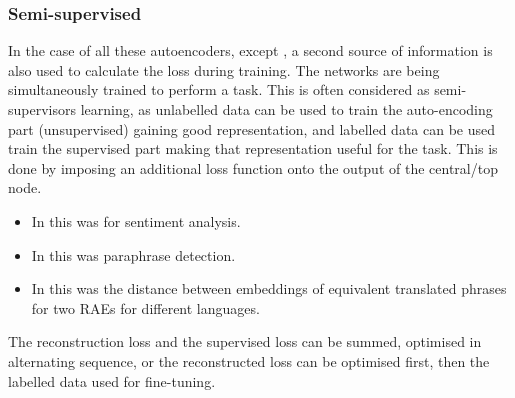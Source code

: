\documentclass[12pt,parskip]{komatufte}
\begin{document}
\subsubsection{Semi-supervised}
In the case of all these autoencoders, except \textcite{iyyer2014generating}, a second source of information is also used to calculate the loss during training.
The networks are being simultaneously trained to perform a task.
This is often considered as semi-supervisors learning, as unlabelled data can be used to train the auto-encoding part (unsupervised) gaining good representation, and labelled data can be used train the supervised part making that representation useful for the task.
This is done by imposing an additional loss function onto the output of the central/top node.
\begin{itemize}
 \item In \textcite{SocherEtAl2011:RAE} this was for sentiment analysis.
 \item In \textcite{SocherEtAl2011:PoolRAE} this was paraphrase detection.
 \item In \textcite{zhang2014BRAE} this was the distance between embeddings of equivalent translated phrases for two RAEs for different languages.
\end{itemize}
The reconstruction loss and the supervised loss can be summed, optimised in alternating sequence, or the reconstructed loss can be optimised first, then the labelled data used for fine-tuning.

 


\end{document}
